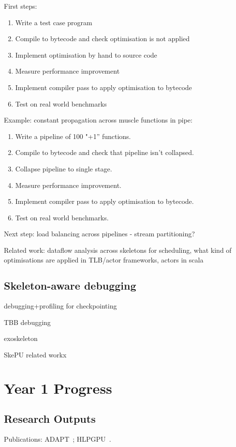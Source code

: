 First steps:
%
\begin{enumerate}
\item Write a test case program
\item Compile to bytecode and check optimisation is not applied
\item Implement optimisation by hand to source code
\item Measure performance improvement
\item Implement compiler pass to apply optimisation to bytecode
\item Test on real world benchmarks
\end{enumerate}
%
Example: constant propagation across muscle functions in pipe:
%
\begin{enumerate}
\item Write a pipeline of 100 "+1” functions.
\item Compile to bytecode and check that pipeline isn’t collapsed.
\item Collapse pipeline to single stage.
\item Measure performance improvement.
\item Implement compiler pass to apply optimisation to bytecode.
\item Test on real world benchmarks.
\end{enumerate}
%
Next step: load balancing across pipelines - stream partitioning?

Related work: dataflow analysis across skeletons for scheduling, what
kind of optimisations are applied in TLB/actor frameworks, actors in
scala


\subsection{Skeleton-aware debugging}
debugging+profiling for checkpointing

TBB debugging

exoskeleton

SkePU related workx


\section{Year 1 Progress}

\subsection{Research Outputs}

Publications: ADAPT~\cite{Cummins2015a}; HLPGPU~\cite{Cummins2016}.

